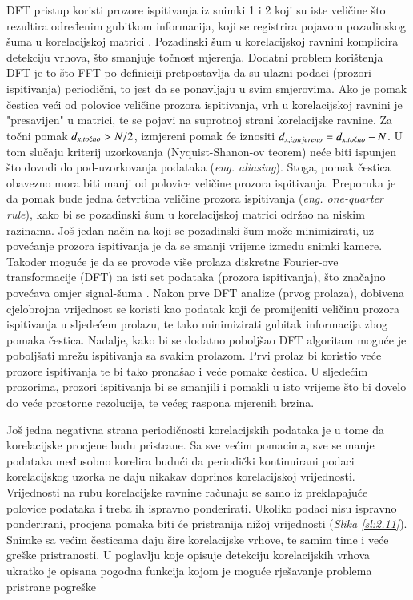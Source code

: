DFT pristup koristi prozore ispitivanja iz snimki 1 i 2 koji su iste veličine što rezultira određenim gubitkom informacija, koji se registrira pojavom pozadinskog šuma u korelacijskoj matrici \cite{thielicke2014_article}. Pozadinski šum u korelacijskoj ravnini komplicira detekciju vrhova, što smanjuje točnost mjerenja. Dodatni problem korištenja DFT je to što FFT po definiciji pretpostavlja da su ulazni podaci (prozori ispitivanja) periodični, to jest da se ponavljaju u svim smjerovima. Ako je pomak čestica veći od polovice veličine prozora ispitivanja, vrh u korelacijskoj ravnini je "presavijen" u matrici, te se pojavi na suprotnoj strani korelacijske ravnine. Za točni pomak $d_{x,to\textup{č}no}>N/2$, izmjereni pomak će iznositi $d_{x,izmjereno}=d_{x,to\textup{č}no}-N$. U tom slučaju kriterij uzorkovanja (Nyquist-Shanon-ov teorem) neće biti ispunjen što dovodi do pod-uzorkovanja podataka (\textit{eng. aliasing}). Stoga, pomak čestica obavezno mora biti manji od polovice veličine prozora ispitivanja. Preporuka je da pomak bude jedna četvrtina veličine prozora ispitivanja (\textit{eng. one-quarter rule}), kako bi se pozadinski šum u korelacijskoj matrici održao na niskim razinama. Još jedan način na koji se pozadinski šum može minimizirati, uz povećanje prozora ispitivanja je da se smanji vrijeme između snimki kamere. Također moguće je da se provode više prolaza diskretne Fourier-ove transformacije (DFT) na isti set podataka (prozora ispitivanja), što značajno povećava omjer signal-šuma \cite{thielicke2014_article}. Nakon prve DFT analize (prvog prolaza), dobivena cjelobrojna vrijednost se koristi kao podatak koji će promijeniti veličinu prozora ispitivanja u sljedećem prolazu, te tako minimizirati gubitak informacija zbog pomaka čestica. Nadalje, kako bi se dodatno poboljšao DFT  algoritam moguće je poboljšati mrežu ispitivanja sa svakim prolazom. Prvi prolaz bi koristio veće prozore ispitivanja te bi tako pronašao i veće pomake čestica. U sljedećim prozorima, prozori ispitivanja bi se smanjili i pomakli u isto vrijeme što bi dovelo do veće prostorne rezolucije, te većeg raspona mjerenih brzina.
\par
Još jedna negativna strana periodičnosti korelacijskih podataka je u tome da korelacijske procjene budu pristrane. Sa sve većim pomacima, sve se manje podataka međusobno korelira budući da periodički kontinuirani podaci korelacijskog uzorka ne daju nikakav doprinos korelacijskoj vrijednosti. Vrijednosti na rubu korelacijske ravnine računaju se samo iz preklapajuće polovice podataka i treba ih ispravno ponderirati. Ukoliko podaci nisu ispravno ponderirani, procjena pomaka biti će pristranija nižoj vrijednosti (\textit{Slika \ref{sl:2.11}}). Snimke sa većim česticama daju šire korelacijske vrhove, te samim time i veće greške pristranosti. U poglavlju koje opisuje detekciju korelacijskih vrhova ukratko je opisana pogodna funkcija kojom je moguće rješavanje problema pristrane pogreške
